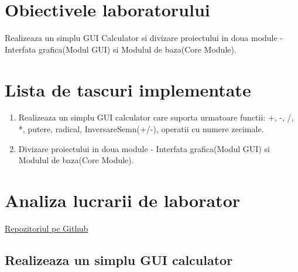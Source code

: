 \documentclass[a4paper, 12pt]{article}
\begin{document}
\section{Obiectivele laboratorului}
Realizeaza un simplu GUI Calculator si divizare proiectului in doua module - Interfata grafica(Modul GUI) si Modulul de baza(Core Module).

\section{Lista de tascuri implementate}
	\begin{enumerate}
	\item Realizeaza un simplu GUI calculator care suporta urmatoare functii: +, -, /, *, putere, radical, InversareSemn(+/-), operatii cu numere zecimale.
	\item Divizare proiectului in doua module - Interfata grafica(Modul GUI) si Modulul de baza(Core Module).
	\end{enumerate}

\section{Analiza lucrarii de laborator}
\href{https://github.com/VladislavCrivenco/MIDPS}{Repozitoriul pe Github}

\subsection{Realizeaza un simplu GUI calculator}
\end{document}
